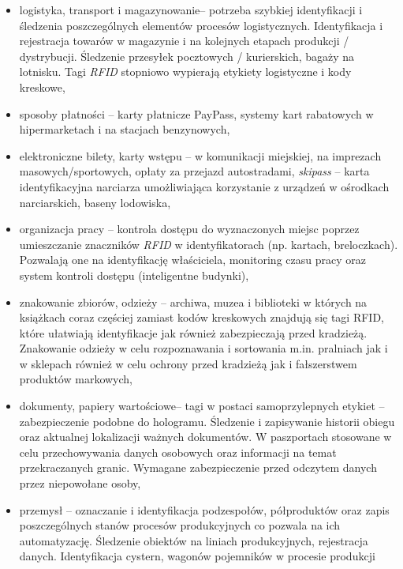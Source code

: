 \begin{itemize}\setlength{\itemsep}{0pt}
	\item logistyka, transport i magazynowanie– potrzeba szybkiej identyfikacji i śledzenia poszczególnych elementów procesów logistycznych. Identyfikacja i rejestracja towarów w magazynie i na kolejnych etapach produkcji / dystrybucji.  Śledzenie przesyłek pocztowych / kurierskich, bagaży na lotnisku.  Tagi \emph{RFID} stopniowo wypierają etykiety logistyczne i kody kreskowe,

	\item sposoby płatności – karty płatnicze PayPass, systemy kart rabatowych w hipermarketach i na stacjach benzynowych, 

	\item elektroniczne bilety, karty wstępu – w komunikacji miejskiej, na imprezach masowych/sportowych, opłaty za przejazd autostradami, \emph{skipass} – karta identyfikacyjna narciarza umożliwiająca korzystanie z urządzeń w ośrodkach narciarskich, baseny lodowiska,

	\item organizacja pracy – kontrola dostępu do wyznaczonych miejsc poprzez umieszczanie znaczników \emph{RFID} w identyfikatorach (np. kartach, breloczkach). Pozwalają one na identyfikację właściciela, monitoring czasu pracy oraz system kontroli dostępu (inteligentne budynki),

	\item znakowanie zbiorów, odzieży – archiwa, muzea i biblioteki w których na książkach coraz częściej zamiast kodów kreskowych znajdują się tagi RFID, które ułatwiają identyfikacje jak również zabezpieczają przed kradzieżą. Znakowanie odzieży w celu rozpoznawania i sortowania m.in. pralniach jak i w sklepach również w celu ochrony przed kradzieżą jak i fałszerstwem produktów markowych,
 	
 	\item dokumenty, papiery wartościowe– tagi w postaci samoprzylepnych etykiet – zabezpieczenie podobne do hologramu. Śledzenie i zapisywanie historii obiegu oraz aktualnej lokalizacji ważnych dokumentów.  W paszportach stosowane w celu przechowywania danych osobowych oraz informacji na temat przekraczanych granic. Wymagane zabezpieczenie przed odczytem danych przez niepowołane osoby,
	
	\item przemysł – oznaczanie i  identyfikacja podzespołów, półproduktów oraz zapis poszczególnych stanów procesów produkcyjnych co pozwala na ich automatyzację. Śledzenie obiektów na liniach produkcyjnych, rejestracja danych. Identyfikacja cystern, wagonów pojemników w procesie produkcji
	

\end{itemize}
